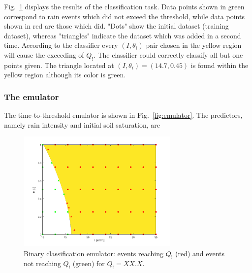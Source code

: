 Fig.~\ref{fig:classifier} displays the results of the classification task.
Data points shown in green correspond to rain events which did not exceed the threshold, while data points shown in red are those which did.
"Dots" show the initial dataset (training dataset), whereas "triangles" indicate the dataset which was added in a second time.
According to the classifier every $(I, \theta_i)$ pair chosen in the yellow region will cause the exceeding of $Q_!$.
The classifier could correctly classify all but one points given.
The triangle located at $(I, \theta_i) = (14.7, 0.45)$ is found within the yellow region although its color is green.


\subsubsection{The emulator}

The time-to-threshold emulator is shown in Fig.~\ref{fig:emulator}.
The predictors, namely rain intensity and initial soil saturation, are


\begin{figure}[h]
  \centering
  \includegraphics[width=0.7\textwidth]{Figures/classifier.png}
  \caption{Binary classification emulator: events reaching $Q_!$ (red) and events not reaching $Q_!$ (green) for $Q_! = XX.X$.}
  \label{fig:classifier}
\end{figure}


